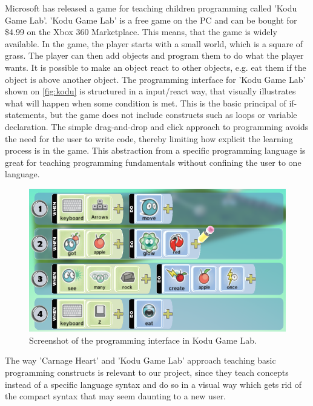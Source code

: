 Microsoft has released a game for teaching children programming called 'Kodu Game Lab'.\cite{kodu}
'Kodu Game Lab' is a free game on the PC and can be bought for \$4.99 on the Xbox 360 Marketplace.
This means, that the game is widely available.
In the game, the player starts with a small world, which is a square of grass.
The player can then add objects and program them to do what the player wants.
It is possible to make an object react to other objects, e.g. eat them if the object is above another object.
The programming interface for 'Kodu Game Lab' shown on \autoref{fig:kodu} is structured in a input/react way, that visually illustrates what will happen when some condition is met. This is the basic principal of if-statements, but the game does not include constructs such as loops or variable declaration. The simple drag-and-drop and click approach to programming avoids the need for the user to write code, thereby limiting how explicit the learning process is in the game. This abstraction from a specific programming language is great for teaching programming fundamentals without confining the user to one language.

\begin{figure}[ht]
  \centering
    \includegraphics[width=\textwidth]{img/kodu.png}
  \caption{Screenshot of the programming interface in Kodu Game Lab.}
  \label{fig:kodu}
\end{figure}

The way 'Carnage Heart' and 'Kodu Game Lab' approach teaching basic programming constructs is relevant to our project, since they teach concepts instead of a specific language syntax and do so in a visual way which gets rid of the compact syntax that may seem daunting to a new user.